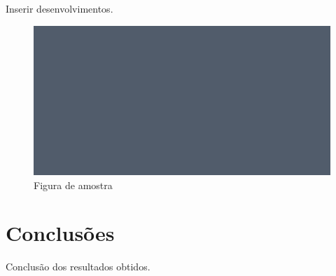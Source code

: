 \documentclass[12pt]{article}
\begin{document}
Inserir desenvolvimentos.

\begin{figure}[H]

{\centering \includegraphics[width=1\linewidth]{../figures/sample_figure_1} 

}

\caption{Figura de amostra}\label{fig:figuraExemplo}
\end{figure}

\hypertarget{conclusuxf5es}{%
\section{Conclusões}\label{conclusuxf5es}}

Conclusão dos resultados obtidos.



\end{document}
